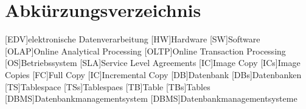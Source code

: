\chapter*{Abkürzungsverzeichnis}
\begin{acronym}

  [EDV]{elektronische Datenverarbeitung}
  [HW]{Hardware}
  [SW]{Software}
  [OLAP]{Online Analytical Processing}
  [OLTP]{Online Transaction Processing}
  [OS]{Betriebssystem}
  [SLA]{Service Level Agreements}
  [IC]{Image Copy}
  [ICs]{Image Copies}
  [FC]{Full Copy}
  [IC]{Incremental Copy}
  [DB]{Datenbank}
  [DBs]{Datenbanken}
  [TS]{Tablespace}
  [TSs]{Tablespaes}
  [TB]{Table}
  [TBs]{Tables}
  [DBMS]{Datenbankmanagementsystem}
  [DBMS]{Datenbankmanagementsysteme}
  

\end{acronym}
